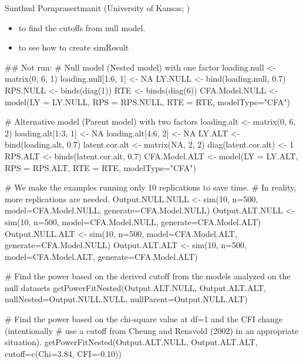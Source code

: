 \documentclass[a4paper]{book}
\begin{document}
%
\begin{Author}\relax
Sunthud Pornprasertmanit (University of Kansas; )
\end{Author}
%
\begin{SeeAlso}\relax
\begin{itemize}

\item {} to find the cutoffs from null model.
\item {} to see how to create simResult

\end{itemize}

\end{SeeAlso}
%
\begin{Examples}
\begin{ExampleCode}
## Not run: 
# Null model (Nested model) with one factor
loading.null <- matrix(0, 6, 1)
loading.null[1:6, 1] <- NA
LY.NULL <- bind(loading.null, 0.7)
RPS.NULL <- binds(diag(1))
RTE <- binds(diag(6))
CFA.Model.NULL <- model(LY = LY.NULL, RPS = RPS.NULL, RTE = RTE, modelType="CFA")

# Alternative model (Parent model) with two factors
loading.alt <- matrix(0, 6, 2)
loading.alt[1:3, 1] <- NA
loading.alt[4:6, 2] <- NA
LY.ALT <- bind(loading.alt, 0.7)
latent.cor.alt <- matrix(NA, 2, 2)
diag(latent.cor.alt) <- 1
RPS.ALT <- binds(latent.cor.alt, 0.7)
CFA.Model.ALT <- model(LY = LY.ALT, RPS = RPS.ALT, RTE = RTE, modelType="CFA")

# We make the examples running only 10 replications to save time.
# In reality, more replications are needed.
Output.NULL.NULL <- sim(10, n=500, model=CFA.Model.NULL, generate=CFA.Model.NULL) 
Output.ALT.NULL <- sim(10, n=500, model=CFA.Model.NULL, generate=CFA.Model.ALT) 
Output.NULL.ALT <- sim(10, n=500, model=CFA.Model.ALT, generate=CFA.Model.NULL) 
Output.ALT.ALT <- sim(10, n=500, model=CFA.Model.ALT, generate=CFA.Model.ALT) 

# Find the power based on the derived cutoff from the models analyzed on the null datasets
getPowerFitNested(Output.ALT.NULL, Output.ALT.ALT, nullNested=Output.NULL.NULL, 
	nullParent=Output.NULL.ALT)

# Find the power based on the chi-square value at df=1 and the CFI change (intentionally
# use a cutoff from Cheung and Rensvold (2002) in an appropriate situation).
getPowerFitNested(Output.ALT.NULL, Output.ALT.ALT, cutoff=c(Chi=3.84, CFI=-0.10))


\end{ExampleCode}
\end{Examples}
\end{document}
